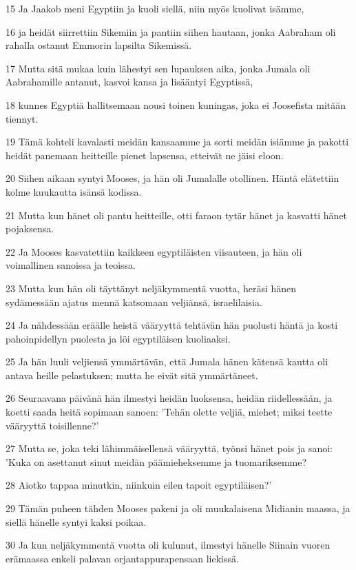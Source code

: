 \par 15 Ja Jaakob meni Egyptiin ja kuoli siellä, niin myös kuolivat isämme,
\par 16 ja heidät siirrettiin Sikemiin ja pantiin siihen hautaan, jonka Aabraham oli rahalla ostanut Emmorin lapsilta Sikemissä.
\par 17 Mutta sitä mukaa kuin lähestyi sen lupauksen aika, jonka Jumala oli Aabrahamille antanut, kasvoi kansa ja lisääntyi Egyptissä,
\par 18 kunnes Egyptiä hallitsemaan nousi toinen kuningas, joka ei Joosefista mitään tiennyt.
\par 19 Tämä kohteli kavalasti meidän kansaamme ja sorti meidän isiämme ja pakotti heidät panemaan heitteille pienet lapsensa, etteivät ne jäisi eloon.
\par 20 Siihen aikaan syntyi Mooses, ja hän oli Jumalalle otollinen. Häntä elätettiin kolme kuukautta isänsä kodissa.
\par 21 Mutta kun hänet oli pantu heitteille, otti faraon tytär hänet ja kasvatti hänet pojaksensa.
\par 22 Ja Mooses kasvatettiin kaikkeen egyptiläisten viisauteen, ja hän oli voimallinen sanoissa ja teoissa.
\par 23 Mutta kun hän oli täyttänyt neljäkymmentä vuotta, heräsi hänen sydämessään ajatus mennä katsomaan veljiänsä, israelilaisia.
\par 24 Ja nähdessään eräälle heistä vääryyttä tehtävän hän puolusti häntä ja kosti pahoinpidellyn puolesta ja löi egyptiläisen kuoliaaksi.
\par 25 Ja hän luuli veljiensä ymmärtävän, että Jumala hänen kätensä kautta oli antava heille pelastuksen; mutta he eivät sitä ymmärtäneet.
\par 26 Seuraavana päivänä hän ilmestyi heidän luoksensa, heidän riidellessään, ja koetti saada heitä sopimaan sanoen: 'Tehän olette veljiä, miehet; miksi teette vääryyttä toisillenne?'
\par 27 Mutta se, joka teki lähimmäisellensä vääryyttä, työnsi hänet pois ja sanoi: 'Kuka on asettanut sinut meidän päämieheksemme ja tuomariksemme?
\par 28 Aiotko tappaa minutkin, niinkuin eilen tapoit egyptiläisen?'
\par 29 Tämän puheen tähden Mooses pakeni ja oli muukalaisena Midianin maassa, ja siellä hänelle syntyi kaksi poikaa.
\par 30 Ja kun neljäkymmentä vuotta oli kulunut, ilmestyi hänelle Siinain vuoren erämaassa enkeli palavan orjantappurapensaan liekissä.
